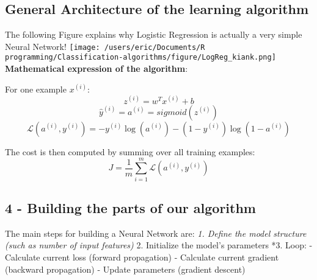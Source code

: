 \documentclass[]{article}
\newenvironment{Shaded}{\begin{snugshade}}{\end{snugshade}}
\newcommand{\KeywordTok}[1]{\textcolor[rgb]{0.13,0.29,0.53}{\textbf{#1}}}
\newcommand{\DataTypeTok}[1]{\textcolor[rgb]{0.13,0.29,0.53}{#1}}
\newcommand{\DecValTok}[1]{\textcolor[rgb]{0.00,0.00,0.81}{#1}}
\newcommand{\StringTok}[1]{\textcolor[rgb]{0.31,0.60,0.02}{#1}}
\newcommand{\OperatorTok}[1]{\textcolor[rgb]{0.81,0.36,0.00}{\textbf{#1}}}
\newcommand{\NormalTok}[1]{#1}
\begin{document}
\begin{Shaded}
\end{Shaded}

\subsection{General Architecture of the learning
algorithm}\label{general-architecture-of-the-learning-algorithm}

The following Figure explains why Logistic Regression is actually a very
simple Neural Network!
\texttt{[image: /users/eric/Documents/R programming/Classification-algorithms/figure/LogReg\_kiank.png]}
\textbf{Mathematical expression of the algorithm}:

For one example \(x^{(i)}\): \[z^{(i)} = w^T x^{(i)} + b \tag{1}\]
\[\hat{y}^{(i)} = a^{(i)} = sigmoid(z^{(i)})\tag{2}\]
\[ \mathcal{L}(a^{(i)}, y^{(i)}) =  - y^{(i)}  \log(a^{(i)}) - (1-y^{(i)} )  \log(1-a^{(i)})\tag{3}\]

The cost is then computed by summing over all training examples:
\[ J = \frac{1}{m} \sum_{i=1}^m \mathcal{L}(a^{(i)}, y^{(i)})\tag{6}\]

\subsection{4 - Building the parts of our
algorithm}\label{building-the-parts-of-our-algorithm}

The main steps for building a Neural Network are: \emph{1. Define the
model structure (such as number of input features) }2. Initialize the
model's parameters *3. Loop: - Calculate current loss (forward
propagation) - Calculate current gradient (backward propagation) -
Update parameters (gradient descent)
\end{document}
